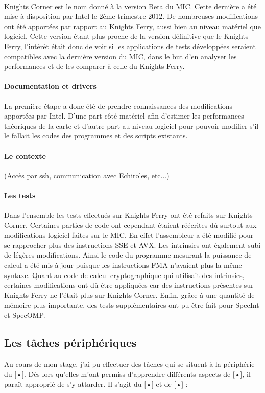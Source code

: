 \documentclass{article}
\begin{document}
				\paragraph{}
				Knights Corner est le nom donné à la version Beta du MIC. Cette dernière a été mise à disposition par Intel le 2ème trimestre 
				2012. De nombreuses modifications ont été apportées par rapport au Knights Ferry, aussi bien au niveau matériel que logiciel. 
				Cette version étant plus proche de la version définitive que le Knights Ferry, l'intérêt était donc de voir 
				si les applications de tests développées seraient compatibles avec la dernière version du MIC, dans le but d'en 
				analyser les performances et de les comparer à celle du Knights Ferry.
				\paragraph{Documentation et drivers}
				La première étape a donc été de prendre connaissances des modifications apportées par Intel. D'une part côté 
				matériel afin d'estimer les performances théoriques de la carte et d'autre part au niveau logiciel pour pouvoir 
				modifier s'il le fallait les codes des programmes et des scripts existants.
				\paragraph{Le contexte}
				(Accès par ssh, communication avec Echiroles, etc...)
				\paragraph{Les tests}
				Dans l'ensemble les tests effectués sur Knights Ferry ont été refaits sur Knights Corner. Certaines parties 
				de code ont cependant étaient réécrites dû surtout aux modifications logiciel faites sur le MIC. En effet l'assembleur 
				a été modifié pour se rapprocher plus des instructions SSE et AVX. Les intrinsics ont également subi de légères 
				modifications. \newline
				Ainsi le code du programme mesurant la puissance de calcul a été mis à jour puisque les instructions FMA n'avaient plus la même
				syntaxe. Quant au code de calcul cryptographique qui utilisait des intrinsics, certaines modifications ont dû être 
				appliquées car des instructions présentes sur Knights Ferry ne l'était plus sur Knights Corner. Enfin, grâce à 
				une quantité de mémoire plus importante, des tests supplémentaires ont pu être fait pour SpecInt et SpecOMP.
		\subsection{Les tâches périphériques}
		Au cours de mon stage, j’ai pu effectuer des tâches qui se situent à la périphérie du [•]. Dès lors qu’elles 
		m’ont permiss d’apprendre différents aspects de [•], il paraît approprié de s’y attarder. Il s’agit du [•] et 
		de [•] :
\end{document}
